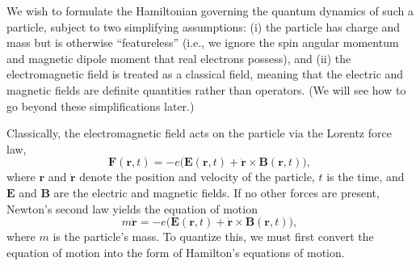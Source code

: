 \documentclass[pra,12pt]{revtex4}
\begin{document}
We wish to formulate the Hamiltonian governing the quantum dynamics of
such a particle, subject to two simplifying assumptions: (i) the
particle has charge and mass but is otherwise ``featureless'' (i.e.,
we ignore the spin angular momentum and magnetic dipole moment that
real electrons possess), and (ii) the electromagnetic field is treated
as a classical field, meaning that the electric and magnetic fields
are definite quantities rather than operators.  (We will see how to go
beyond these simplifications later.)

Classically, the electromagnetic field acts on the particle via the
Lorentz force law,
\begin{equation}
  \mathbf{F}(\mathbf{r},t) = -e\Big(\mathbf{E}(\mathbf{r},t)
  + \dot{\mathbf{r}}\times \mathbf{B}(\mathbf{r},t)\Big),
\end{equation}
where $\mathbf{r}$ and $\dot{\mathbf{r}}$ denote the position and
velocity of the particle, $t$ is the time, and $\mathbf{E}$ and
$\mathbf{B}$ are the electric and magnetic fields.  If no other forces
are present, Newton's second law yields the equation of motion
\begin{equation}
  m\ddot{\mathbf{r}} = -e\Big(\mathbf{E}(\mathbf{r},t)
  + \dot{\mathbf{r}} \times \mathbf{B}(\mathbf{r},t)\Big),
  \label{eom}
\end{equation}
where $m$ is the particle's mass.  To quantize this, we must first
convert the equation of motion into the form of Hamilton's equations
of motion.
\end{document}
